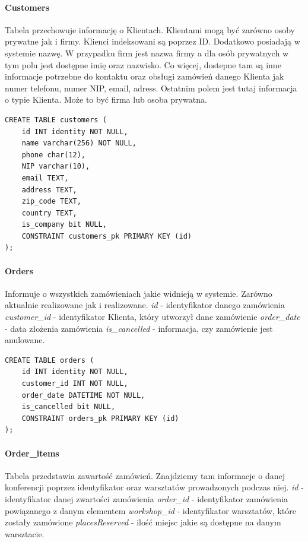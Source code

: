 \documentclass[12pt]{article}
\begin{document}
\paragraph{Customers \newline}
Tabela przechowuje informację o Klientach. Klientami mogą być zarówno osoby prywatne jak i firmy. Klienci indeksowani są poprzez ID. Dodatkowo posiadają w systemie nazwę. W przypadku firm jest nazwa firmy a dla osób prywatnych w tym polu jest dostępne imię oraz nazwisko. Co więcej, dostepne tam są inne informacje potrzebne do kontaktu oraz obsługi zamówień danego Klienta jak numer telefonu, numer NIP, email, adress. Ostatnim polem jest tutaj informacja o typie Klienta. Może to być firma lub osoba prywatna.
\begin{lstlisting}
CREATE TABLE customers (
	id INT identity NOT NULL,
	name varchar(256) NOT NULL,
	phone char(12),
	NIP varchar(10),
	email TEXT,
	address TEXT,
	zip_code TEXT,
	country TEXT,
	is_company bit NULL,
	CONSTRAINT customers_pk PRIMARY KEY (id)
);

\end{lstlisting}
\paragraph{Orders\\}
\noindent
Informuje o wszystkich zamówieniach jakie widnieją w systemie. Zarówno aktualnie realizowane jak i realizowane. \newline \newline
\textit{id} - identyfikator danego zamówienia \newline
\textit{customer\_id} - identyfikator Klienta, który utworzył dane zamówienie \newline
\textit{order\_date} - data złożenia zamówienia \newline
\textit{is\_cancelled} - informacja, czy zamówienie jest anulowane. \\

\begin{lstlisting}
CREATE TABLE orders (
	id INT identity NOT NULL,
	customer_id INT NOT NULL,
	order_date DATETIME NOT NULL,
	is_cancelled bit NULL,
	CONSTRAINT orders_pk PRIMARY KEY (id)
);
\end{lstlisting}
\paragraph{Order\_items \newline}
Tabela przedstawia zawartość zamówień. Znajdziemy tam informacje o danej konferencji poprzez identyfikator oraz warsztatów prowadzonych podczas niej. \newline \newline
\textit{id} - identyfikator danej zwartości zamówienia \newline
\textit{order\_id} - identyfikator zamówienia powiązanego z danym elementem \newline
\textit{workshop\_id} - identyfikator warsztatów, które zostały zamówione \newline
\textit{placesReserved} - ilość miejsc jakie są dostępne na danym warsztacie. \newline
\end{document}
